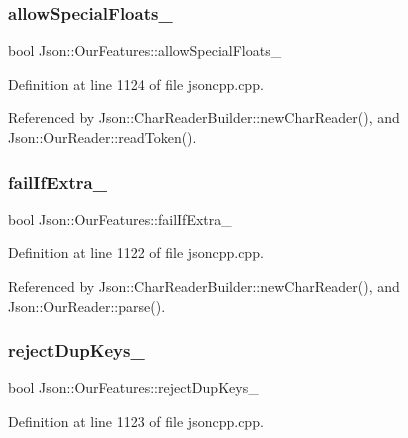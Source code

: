 \subsubsection{\texorpdfstring{allow\+Special\+Floats\+\_\+}{allowSpecialFloats\_}}
{\footnotesize\ttfamily bool Json\+::\+Our\+Features\+::allow\+Special\+Floats\+\_\+}



Definition at line 1124 of file jsoncpp.\+cpp.



Referenced by Json\+::\+Char\+Reader\+Builder\+::new\+Char\+Reader(), and Json\+::\+Our\+Reader\+::read\+Token().

\mbox{\label{class_json_1_1_our_features_ae8ad25b90706c78f1a8fe929191ac61b}} 
\subsubsection{\texorpdfstring{fail\+If\+Extra\+\_\+}{failIfExtra\_}}
{\footnotesize\ttfamily bool Json\+::\+Our\+Features\+::fail\+If\+Extra\+\_\+}



Definition at line 1122 of file jsoncpp.\+cpp.



Referenced by Json\+::\+Char\+Reader\+Builder\+::new\+Char\+Reader(), and Json\+::\+Our\+Reader\+::parse().

\mbox{\label{class_json_1_1_our_features_a39b8e0b86b1c24a45e800c023bb715aa}} 
\subsubsection{\texorpdfstring{reject\+Dup\+Keys\+\_\+}{rejectDupKeys\_}}
{\footnotesize\ttfamily bool Json\+::\+Our\+Features\+::reject\+Dup\+Keys\+\_\+}



Definition at line 1123 of file jsoncpp.\+cpp.



